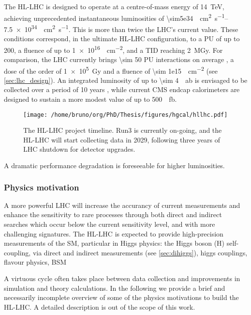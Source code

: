 \documentclass[11pt]{article}
\begin{document}
The \ac{HL-LHC} is designed to operate at a centre-of-mass energy of \SI{14}{\TeV}, achieving unprecedented instantaneous luminosities of \SIrange{\sim5e34}{7.5e34}{\per\cm\squared\per\second}.
This is more than twice the \ac{LHC}’s current value.
These conditions correspond, in the ultimate HL-LHC configuration, to a \ac{PU} of up to 200, a fluence of up to \SI{1e16}{\nequiv\per\cm\squared}, and a \ac{TID} reaching \SI{2}{\mega\gray}.
For comparison, the \ac{LHC} currently brings \num{\sim 50} \ac{PU} interactions on average \cite{pileup_twiki}, a dose of the order of \SI{1e5}{\gray} and a fluence of \SI{\sim 1e15}{\nequiv\per\cm\squared} \cite{lhc_fluences} (see \cref{sec:lhc_design}).
An integrated luminosity of up to \SI{\sim 4}{\per\atto\barn} is envisaged to be collected over a period of 10 years \cite{hllhc}, while current \ac{CMS} endcap calorimeters are designed to sustain a more modest value of up to \SI{500}{\per\femto\barn}.

\begin{figure}[htbp]
\centering
\texttt{[image: /home/bruno/org/PhD/Thesis/figures/hgcal/hllhc.pdf]}
\caption{\label{fig:hllhc}The \ac{HL-LHC} project timeline. Run3 is currently on-going, and the \ac{HL-LHC} will start collecting data in 2029, following three years of \ac{LHC} shutdown for detector upgrades.}
\end{figure}

A dramatic performance degradation is foreseeable for higher luminosities.

\subsubsection{Physics motivation}
\label{sec:orge2b7a77}
\label{sec:hllhc_physics}

A more powerful \ac{LHC} will increase the accurancy of current measurements and enhance the sensitivity to rare processes through both direct and indirect searches which occur below the current sensitivity level, and with more challenging signatures.
The \ac{HL-LHC} is expected to provide high-precision measurements of the \ac{SM}, particular in Higgs physics: the Higgs boson (H) self-coupling, via direct and indirect measurements (see \cref{sec:dihiggs}), higgs couplings, flavour physics, BSM

A virtuous cycle often takes place between data collection and improvements in simulation and theory calculations.
In the following we provide a brief and necessarily incomplete overview of some of the physics motivations to build the \ac{HL-LHC}.
A detailed description is out of the scope of this work.
\end{document}
